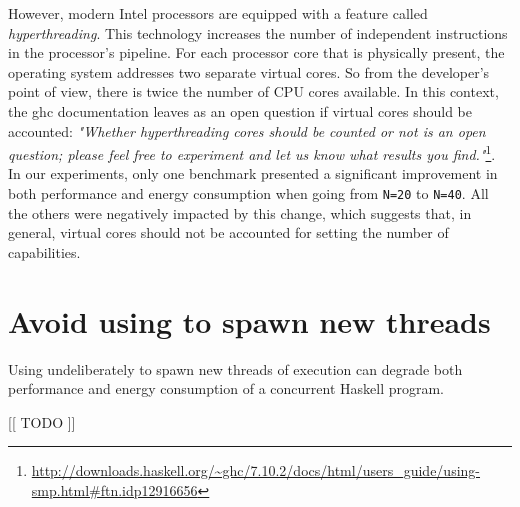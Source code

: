 However, modern Intel processors are equipped with a feature called \emph{hyperthreading}. This technology increases the number of independent instructions in the processor's pipeline. For each processor core that is physically present, the operating system addresses two separate virtual cores. So from the developer's point of view, there is twice the number of CPU cores available. In this context, the \ac{ghc} documentation leaves as an open question if virtual cores should be accounted: \emph{"Whether hyperthreading cores should be counted or not is an open question; please feel free to experiment and let us know what results you find."}\footnote{\url{http://downloads.haskell.org/~ghc/7.10.2/docs/html/users\_guide/using-smp.html\#ftn.idp12916656}}. In our experiments, only one benchmark presented a significant improvement in both performance and energy consumption when going from \texttt{N=20} to \texttt{N=40}. All the others were negatively impacted by this change, which suggests that, in general, virtual cores should not be accounted for setting the number of capabilities.


\section{Avoid using \forkOS to spawn new threads}
 Using \forkOS undeliberately to spawn new threads of execution can degrade both performance and energy consumption of a concurrent Haskell program.
\newline

 [[ TODO ]]
